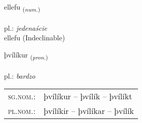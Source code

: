 \documentclass[frontgrid, backgrid]{flacards}\usepackage[]{graphicx}\usepackage[]{xcolor}
\begin{document}

\renewcommand{\flhead}{\vskip5pt \fboxsep=0pt {\small\bfseries\footnotesize Töluorð | liczebnik}}
\renewcommand{\fcfoot}{\vskip5pt \fboxsep=0pt \hspace{2pt}{\small\bfseries\footnotesize 3K}}

\renewcommand{\blhead}{\vskip5pt {\small\bfseries\footnotesize Töluorð | liczebnik }}
\renewcommand{\bcfoot}{\vskip5pt \hspace{2pt}{\small\bfseries\footnotesize 3K}}


{ellefu \small{\textsubscript{(\textit{num.})}} \\[1ex]
\textphonetic{[ɛtlɛvʏ]} \\
pl.: \emph{jedenaście} \\  [2ex]
ellefu (Indeclinable)}

\renewcommand{\flhead}{\vskip5pt \fboxsep=0pt {\small\bfseries\footnotesize Fornafn | zaimek}}
\renewcommand{\fcfoot}{\vskip5pt \fboxsep=0pt \hspace{2pt}{\small\bfseries\footnotesize 3K}}

\renewcommand{\blhead}{\vskip5pt {\small\bfseries\footnotesize Fornafn | zaimek }}
\renewcommand{\bcfoot}{\vskip5pt \hspace{2pt}{\small\bfseries\footnotesize 3K}}


{þvílíkur \small{\textsubscript{(\textit{pron.})}} \\[1ex] %
\textphonetic{[θviːlikʏr]} \\
pl.: \emph{bardzo} \\  [2ex]
\renewcommand*{\arraystretch}{0.8}
\begin{tabular}{ll}
\textsc{sg.nom.}: & þvílíkur  --  þvílík -- þvílíkt \\ 
\textsc{pl.nom.}: & þvílíkir -- þvílíkar -- þvílík
\end{tabular}
}

\renewcommand{\flhead}{\vskip5pt \fboxsep=0pt {\small\bfseries\footnotesize Sagnorð | czasownik}}
\renewcommand{\fcfoot}{\vskip5pt \fboxsep=0pt \hspace{2pt}{\small\bfseries\footnotesize 3K}}
\end{document}
